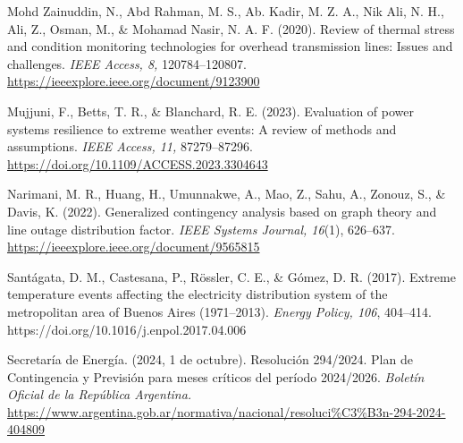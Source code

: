Mohd Zainuddin, N., Abd Rahman, M. S., Ab. Kadir, M. Z. A., Nik Ali, N. H., Ali, Z., Osman, M., \& Mohamad Nasir, N. A. F. (2020). Review of thermal stress and condition monitoring technologies for overhead transmission lines: Issues and challenges. \emph{IEEE Access, 8,} 120784--120807. \url{https://ieeexplore.ieee.org/document/9123900}

Mujjuni, F., Betts, T. R., \& Blanchard, R. E. (2023). Evaluation of power systems resilience to extreme weather events: A review of methods and assumptions. \emph{IEEE Access, 11,} 87279--87296. \url{https://doi.org/10.1109/ACCESS.2023.3304643}

Narimani, M. R., Huang, H., Umunnakwe, A., Mao, Z., Sahu, A., Zonouz, S., \& Davis, K. (2022). Generalized contingency analysis based on graph theory and line outage distribution factor. \emph{IEEE Systems Journal, 16}(1), 626--637. \url{https://ieeexplore.ieee.org/document/9565815}

Santágata, D. M., Castesana, P., Rössler, C. E., \& Gómez, D. R. (2017). Extreme temperature events affecting the electricity distribution system of the metropolitan area of Buenos Aires (1971--2013). \emph{Energy Policy, 106}, 404--414. https://doi.org/10.1016/j.enpol.2017.04.006

Secretaría de Energía. (2024, 1 de octubre). Resolución 294/2024. Plan de Contingencia y Previsión para meses críticos del período 2024/2026. \emph{Boletín Oficial de la República Argentina.} \url{https://www.argentina.gob.ar/normativa/nacional/resoluci\%C3\%B3n-294-2024-404809}
